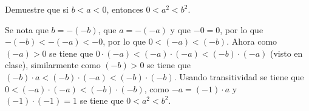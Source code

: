 \documentclass{ayudantia}
\begin{document}
\begin{prob}
    Demuestre que si \(b<a<0\), entonces \(0<a^2<b^2\).
\end{prob}

\begin{ans}
    \begin{sol}
        Se nota que \(b=-(-b)\), que \(a=-(-a)\) y que \(-0=0\), por lo que \(-(-b)<-(-a)<-0\), por lo que \(0<(-a)<(-b)\). Ahora como \((-a)>0\) se tiene que \(0\cdot(-a)<(-a)\cdot(-a)<(-b)\cdot(-a)\) (visto en clase), similarmente como \((-b)>0\) se tiene que \((-b)\cdot a<(-b)\cdot (-a)<(-b)\cdot(-b)\). Usando transitividad se tiene que \(0<(-a)\cdot(-a)<(-b)\cdot(-b)\), como \(-a=(-1)\cdot a\) y \((-1)\cdot(-1)=1\) se tiene que \(0<a^2<b^2\).
    \end{sol}
\end{ans}
\end{document}
